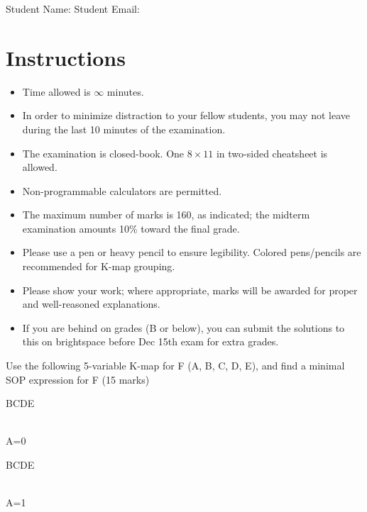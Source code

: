 \maketitle

Student Name: \hfill Student Email: \hspace{10em}
\section{Instructions}
\begin{itemize}
  \item Time allowed is $\infty$ minutes.
  \item In order to minimize distraction to your fellow students, you may not leave
  during the last 10 minutes of the examination.
  \item The examination is closed-book. One $8\times11$ in two-sided cheatsheet is allowed.
  \item Non-programmable calculators are permitted.
  \item The maximum number of marks is 160, as indicated; the midterm examination
  amounts 10\% toward the final grade.
  \item Please use a pen or heavy pencil to ensure legibility. Colored
    pens/pencils are recommended for K-map grouping.
  \item Please show your work; where appropriate, marks will be awarded for proper and well-reasoned explanations.
  \item If you are behind on grades (B or below), you can submit the solutions to this on brightspace before Dec 15th exam for extra grades.
\end{itemize}

\begin{prob}
Use the following 5-variable K-map for F (A, B, C, D, E), and find
  a minimal SOP expression for F (15 marks)\\
\begin{minipage}{0.5\linewidth}
  \centering
  \begin{Karnaugh}{BC}{DE}
  \end{Karnaugh}\\
  A=0
\end{minipage}%
\begin{minipage}{0.5\linewidth}
  \centering
  \begin{Karnaugh}{BC}{DE}
  \end{Karnaugh}\\
  A=1
\end{minipage}
\end{prob}

